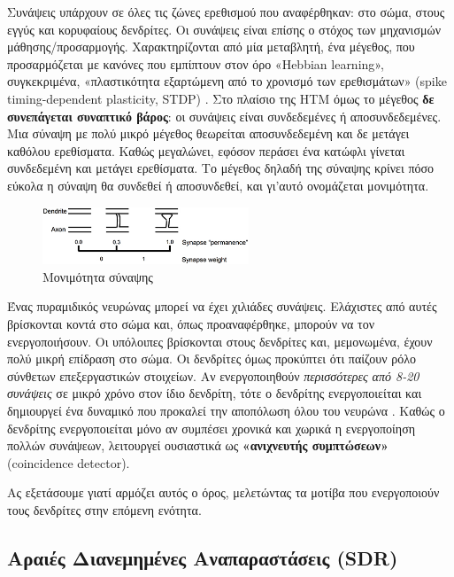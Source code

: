 	Συνάψεις υπάρχουν σε όλες τις ζώνες ερεθισμού που αναφέρθηκαν:
	στο σώμα, στους εγγύς και κορυφαίους δενδρίτες.
	Οι συνάψεις είναι επίσης ο στόχος των μηχανισμών μάθησης/προσαρμογής.
  Χαρακτηρίζονται από μία μεταβλητή, ένα μέγεθος, που προσαρμόζεται με κανόνες που εμπίπτουν στον όρο «Hebbian learning»,
	συγκεκριμένα, «πλαστικότητα εξαρτώμενη από το χρονισμό των ερεθισμάτων» (spike timing-dependent plasticity, STDP) \parencite{songCompetitiveHebbianLearning2000}.
	Στο πλαίσιο της HTM όμως το μέγεθος \textbf{δε συνεπάγεται συναπτικό βάρος}: οι συνάψεις είναι συνδεδεμένες ή αποσυνδεδεμένες.
	Μια σύναψη με πολύ μικρό μέγεθος θεωρείται αποσυνδεδεμένη και δε μετάγει καθόλου ερεθίσματα.
	Καθώς μεγαλώνει, εφόσον περάσει ένα κατώφλι γίνεται συνδεδεμένη και μετάγει ερεθίσματα.
  Το μέγεθος δηλαδή της σύναψης κρίνει πόσο εύκολα η σύναψη θα συνδεθεί ή αποσυνδεθεί, και γι'αυτό ονομάζεται μονιμότητα.

	\begin{figure}
		\centering
		\includegraphics[width=0.55\textwidth]{figures/synapse_permanence}
		\caption{Μονιμότητα σύναψης}
		\label{fig:synapse_permanence}
	\end{figure}

	Ένας πυραμιδικός νευρώνας μπορεί να έχει χιλιάδες συνάψεις. Ελάχιστες από αυτές βρίσκονται κοντά στο σώμα και, όπως προαναφέρθηκε, μπορούν να τον ενεργοποιήσουν.
	Οι υπόλοιπες βρίσκονται στους δενδρίτες και, μεμονωμένα, έχουν πολύ μικρή επίδραση στο σώμα.
	Οι δενδρίτες όμως προκύπτει ότι παίζουν ρόλο σύνθετων επεξεργαστικών στοιχείων.
	Αν ενεργοποιηθούν \textit{περισσότερες από 8-20 συνάψεις} σε μικρό χρόνο στον ίδιο δενδρίτη, τότε ο δενδρίτης ενεργοποιείται και δημιουργεί ένα δυναμικό που προκαλεί την αποπόλωση όλου του νευρώνα \parencite{hawkinsWhyNeuronsHave2016}.
  Καθώς ο δενδρίτης ενεργοποιείται μόνο αν συμπέσει χρονικά και χωρικά η ενεργοποίηση πολλών συνάψεων,
	λειτουργεί ουσιαστικά ως \textbf{«ανιχνευτής συμπτώσεων»} (coincidence detector).

  Ας εξετάσουμε γιατί αρμόζει αυτός ο όρος, μελετώντας τα μοτίβα που ενεργοποιούν τους δενδρίτες στην επόμενη ενότητα.

\subsection{Αραιές Διανεμημένες Αναπαραστάσεις (SDR)} \label{htm:sdr}

